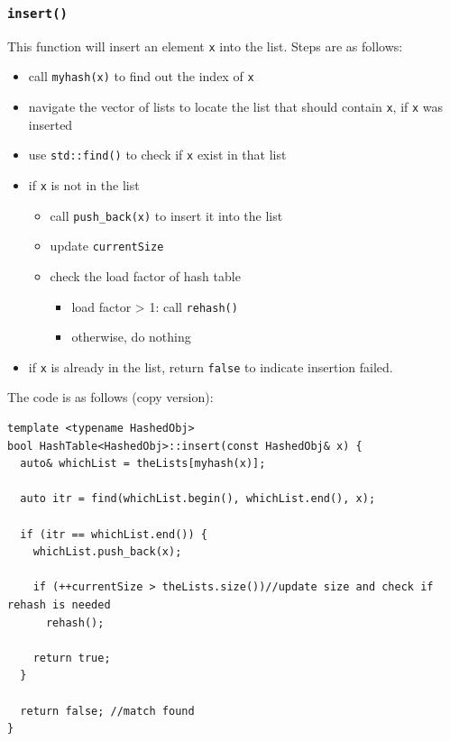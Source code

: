 \documentclass[11pt]{book}
\begin{document}
\subsubsection{\texttt{insert()}}
\label{sec:orgd0ef3c5}
This function will insert an element \texttt{x} into the list. Steps are as follows:
\begin{itemize}
\item call \texttt{myhash(x)} to find out the index of \texttt{x}
\item navigate the vector of lists to locate the list that should contain \texttt{x}, if \texttt{x} was inserted
\item use \texttt{std::find()} to check if \texttt{x} exist in that list
\item if \texttt{x} is not in the list
\begin{itemize}
\item call \texttt{push\_back(x)} to insert it into the list
\item update \texttt{currentSize}
\item check the load factor of hash table
\begin{itemize}
\item load factor > 1: call \texttt{rehash()}
\item otherwise, do nothing
\end{itemize}
\end{itemize}
\item if \texttt{x} is already in the list, return \texttt{false} to indicate insertion failed.
\end{itemize}

The code is as follows (copy version):
\begin{verbatim}
template <typename HashedObj>
bool HashTable<HashedObj>::insert(const HashedObj& x) {
  auto& whichList = theLists[myhash(x)];

  auto itr = find(whichList.begin(), whichList.end(), x);

  if (itr == whichList.end()) {
    whichList.push_back(x);

    if (++currentSize > theLists.size())//update size and check if rehash is needed
      rehash();

    return true;
  }

  return false; //match found
}
\end{verbatim}
\end{document}
